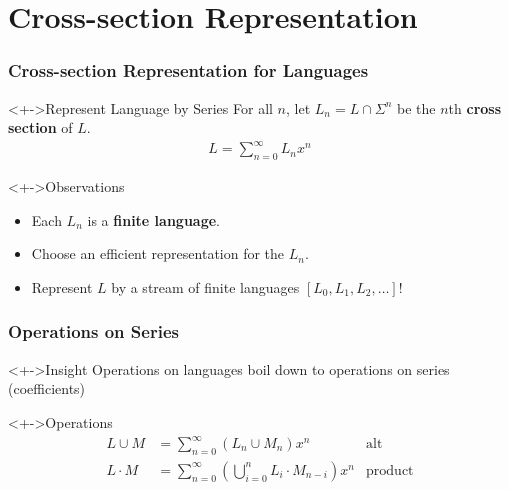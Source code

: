 \documentclass[pdftex,aspectratio=169]{beamer}
\begin{document}
\section{Cross-section Representation}


\begin{frame}
  \frametitle{Cross-section Representation for Languages}
  \vspace{-\baselineskip}
  \begin{block}<+->{Represent Language by Series}
    For all $n$, let
    $L_n = L \cap \Sigma^n$ be the $n$th \textbf{cross section} of $L$.
    \begin{gather*}
      L = \sum_{n=0}^\infty L_nx^n
    \end{gather*}
  \end{block}
  \begin{block}<+->{Observations}
    \begin{itemize}
    \item Each $L_n$ is a \textbf{finite language}.
    \item Choose an efficient representation for the $L_n$.
    \item \alert{Represent $L$ by a stream of finite languages $[L_0, L_1, L_2, \dots ]$!}
    \end{itemize}
  \end{block}
\end{frame}
\begin{frame}
  \frametitle{Operations on Series}
  \begin{alertblock}<+->{Insight}
    Operations on languages boil down to operations on series (coefficients)
  \end{alertblock}
\begin{block}<+->{Operations}
  \vspace{-\baselineskip}
    \begin{align*}
      L \cup M & = \sum_{n=0}^\infty (L_n \cup M_n)x^n & \text{alt}\\
      L \cdot M &= \sum_{n=0}^\infty (\bigcup_{i=0}^n L_i \cdot M_{n-i})x^n & \text{product}
    \end{align*}
  \end{block}
\end{frame}
\end{document}
